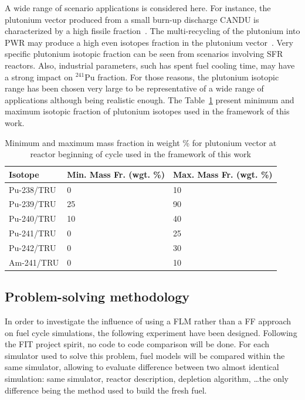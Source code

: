 A wide range of scenario applications is considered here. For instance, the
plutonium vector produced from a small burn-up discharge CANDU is characterized
by a high fissile fraction~\cite{Guillemin_2010}. The multi-recycling of the
plutonium into \gls{PWR} may produce a high even isotopes fraction in the plutonium
vector~\cite{Courtin_2016}. Very specific plutonium isotopic fraction can be
seen from scenarios involving \gls{SFR} reactors. Also, industrial parameters, such
has spent fuel cooling time, may have a strong impact on $^{241}$Pu fraction.
For those reasons, the plutonium isotopic range has been chosen very large to be
representative of a wide range of applications although being realistic enough.
The Table~\ref{Tab:PuVector} present minimum and maximum isotopic fraction of
plutonium isotopes used in the framework of this work.

\begin{table}[h]
\centering
\begin{tabular}{ |l|l|l| }
  \hline
  Isotope & Min. Mass Fr. (wgt. \%) & Max. Mass Fr. (wgt. \%) \\
  \hline
  Pu-238/TRU & 0  & 10 \\
  \hline
  Pu-239/TRU & 25 & 90 \\
  \hline
  Pu-240/TRU & 10 & 40 \\
  \hline
  Pu-241/TRU & 0  & 25 \\
  \hline
  Pu-242/TRU & 0  & 30 \\
  \hline
  Am-241/TRU & 0  & 10 \\
  \hline
\end{tabular}
\label{Tab:PuVector}
\caption{Minimum and maximum mass fraction in weight \% for plutonium vector at
        reactor beginning of cycle used in the framework of this work}
\end{table}

\subsection{Problem-solving methodology}

In order to investigate the influence of using a \gls{FLM} rather than a
\gls{FF} approach on fuel cycle simulations, the following experiment have been
designed. Following the FIT project spirit, no code to code comparison will be
done. For each simulator used to solve this problem, fuel models will be
compared within the same simulator, allowing to evaluate difference between two
almost identical simulation: same simulator, reactor description, depletion
algorithm, \ldots the only difference being the method used to build the fresh fuel.

